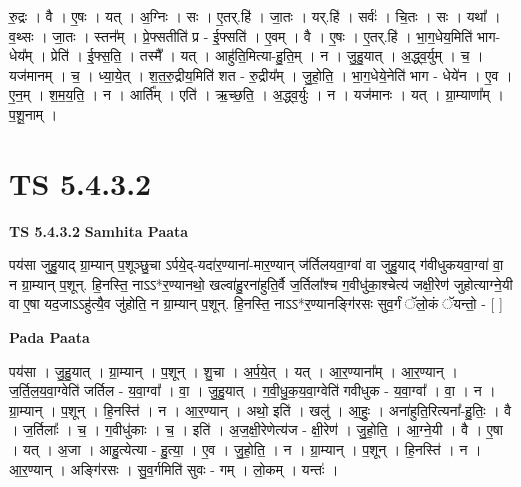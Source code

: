 \documentclass[17pt]{extarticle}
\begin{document}
रु॒द्रः । वै । ए॒षः । यत् । अ॒ग्निः । सः । ए॒तर्.हि॑ । जा॒तः । यर्.हि॑ । सर्वः॑ । चि॒तः । सः । यथा᳚ । व॒थ्सः । जा॒तः । स्तन᳚म् । प्रे॒फ्सतीति॑ प्र - ई॒फ्सति॑ । ए॒वम् । वै । ए॒षः । ए॒तर्.हि॑ । भा॒ग॒धेय॒मिति॑ भाग-धेय᳚म् । प्रेति॑ । ई॒फ्स॒ति॒ । तस्मै᳚ । यत् । आहु॑ति॒मित्या-हु॒ति॒म् । न । जु॒हु॒यात् । अ॒द्ध्व॒र्युम् । च॒ । यज॑मानम् । च॒ । ध्या॒ये॒त् । श॒त॒रु॒द्रीय॒मिति॑ शत - रु॒द्रीय᳚म् । जु॒हो॒ति॒ । भा॒ग॒धेये॒नेति॑ भाग - धेये॑न । ए॒व । ए॒न॒म् । श॒म॒य॒ति॒ । न । आर्ति᳚म् । एति॑ । ऋ॒च्छ॒ति॒ । अ॒द्ध्व॒र्युः । न । यज॑मानः । यत् । ग्रा॒म्याणा᳚म् । प॒शू॒नाम् ।  \newline




\section*{ TS 5.4.3.2 }

\textbf{TS 5.4.3.2 } \newline
\textbf{Samhita Paata} \newline

पय॑सा जुहु॒याद् ग्रा॒म्यान् प॒शूञ्छु॒चा ऽर्पये॒द्-यदा॑र॒ण्याना॑-मार॒ण्यान् ज॑र्तिलयवा॒ग्वा॑ वा जुहु॒याद् ग॑वीधुकयवा॒ग्वा॑ वा॒ न ग्रा॒म्यान् प॒शून्. हि॒नस्ति॒ नाऽऽ*र॒ण्यानथो॒ खल्वा॑हु॒रना॑हुति॒र्वै ज॒र्तिला᳚श्च ग॒वीधु॑का॒श्चेत्य॑ जक्षी॒रेण॑ जुहोत्याग्ने॒यी वा ए॒षा यद॒जाऽऽहु॑त्यै॒व जु॑होति॒ न ग्रा॒म्यान् प॒शून्. हि॒नस्ति॒ नाऽऽ*र॒ण्यानङ्गि॑रसः सुव॒र्गं ॅलो॒कं ॅयन्तो॒ - [  ] \newline

\textbf{Pada Paata} \newline

पय॑सा । जु॒हु॒यात् । ग्रा॒म्यान् । प॒शून् । शु॒चा । अ॒र्प॒ये॒त् । यत् । आ॒र॒ण्याना᳚म् । आ॒र॒ण्यान् । ज॒र्ति॒ल॒य॒वा॒ग्वेति॑ जर्तिल - य॒वा॒ग्वा᳚ । वा॒ । जु॒हु॒यात् । ग॒वी॒धु॒क॒य॒वा॒ग्वेति॑ गवीधुक - य॒वा॒ग्वा᳚ । वा॒ । न । ग्रा॒म्यान् । प॒शून् । हि॒नस्ति॑ । न । आ॒र॒ण्यान् । अथो॒ इति॑ । खलु॑ । आ॒हुः॒ । अना॑हुति॒रित्यना᳚-हु॒तिः॒ । वै । ज॒र्तिलाः᳚ । च॒ । ग॒वीधु॑काः । च॒ । इति॑ । अ॒ज॒क्षी॒रेणेत्य॑ज - क्षी॒रेण॑ । जु॒हो॒ति॒ । आ॒ग्ने॒यी । वै । ए॒षा । यत् । अ॒जा । आहु॒त्येत्या - हु॒त्या॒ । ए॒व । जु॒हो॒ति॒ । न । ग्रा॒म्यान् । प॒शून् । हि॒नस्ति॑ । न । आ॒र॒ण्यान् । अङ्गि॑रसः । सु॒व॒र्गमिति॑ सुवः - गम् । लो॒कम् । यन्तः॑ ।  \newline




\end{document}
